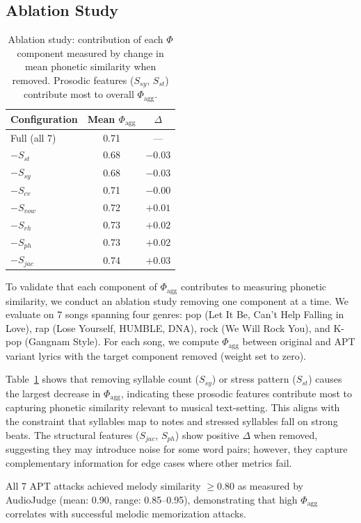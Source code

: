 \subsection{Ablation Study}
\label{sec:ablation}

\begin{table}[h]
\centering
\caption{Ablation study: contribution of each $\Phi$ component measured by change in mean phonetic similarity when removed. Prosodic features ($S_{sy}$, $S_{st}$) contribute most to overall $\Phi_{\text{agg}}$.}
\label{tab:ablation}
\begin{tabular}{lcc}
\toprule
\textbf{Configuration} & \textbf{Mean $\Phi_{\text{agg}}$} & \textbf{$\Delta$} \\
\midrule
Full (all 7)    & 0.71 & --- \\
$-S_{st}$       & 0.68 & $-0.03$ \\
$-S_{sy}$       & 0.68 & $-0.03$ \\
$-S_{cv}$       & 0.71 & $-0.00$ \\
$-S_{vow}$      & 0.72 & $+0.01$ \\
$-S_{rh}$       & 0.73 & $+0.02$ \\
$-S_{ph}$       & 0.73 & $+0.02$ \\
$-S_{jac}$      & 0.74 & $+0.03$ \\
\bottomrule
\end{tabular}
\end{table}

To validate that each component of $\Phi_{\text{agg}}$ contributes to measuring phonetic similarity, we conduct an ablation study removing one component at a time. We evaluate on 7 songs spanning four genres: pop (Let It Be, Can't Help Falling in Love), rap (Lose Yourself, HUMBLE, DNA), rock (We Will Rock You), and K-pop (Gangnam Style). For each song, we compute $\Phi_{\text{agg}}$ between original and APT variant lyrics with the target component removed (weight set to zero).

Table~\ref{tab:ablation} shows that removing syllable count ($S_{sy}$) or stress pattern ($S_{st}$) causes the largest decrease in $\Phi_{\text{agg}}$, indicating these prosodic features contribute most to capturing phonetic similarity relevant to musical text-setting. This aligns with the constraint that syllables map to notes and stressed syllables fall on strong beats. The structural features ($S_{jac}$, $S_{ph}$) show positive $\Delta$ when removed, suggesting they may introduce noise for some word pairs; however, they capture complementary information for edge cases where other metrics fail.

All 7 APT attacks achieved melody similarity $\geq 0.80$ as measured by AudioJudge (mean: 0.90, range: 0.85--0.95), demonstrating that high $\Phi_{\text{agg}}$ correlates with successful melodic memorization attacks.
